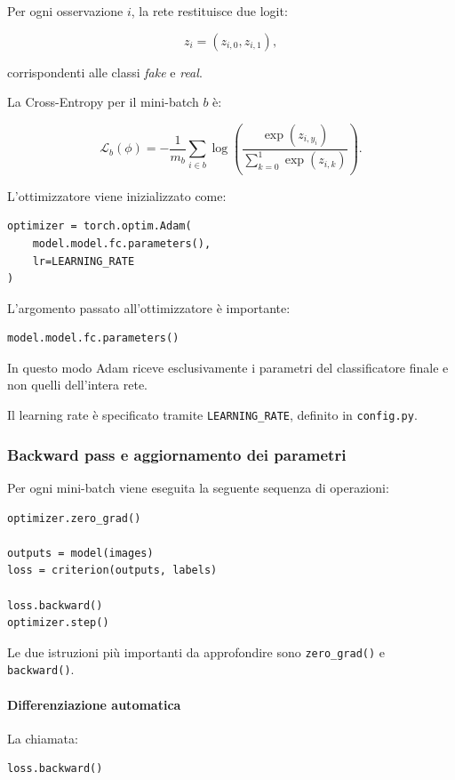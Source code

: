 \documentclass[10pt,a4paper,oneside]{book}
\begin{document}
Per ogni osservazione $i$, la rete restituisce
due logit:

\[
z_i=(z_{i,0},z_{i,1}),
\]

corrispondenti alle classi \textit{fake} e \textit{real}.

La Cross-Entropy per il mini-batch $b$ è:

\[
\mathcal{L}_b(\phi)
=
-\frac{1}{m_b}
\sum_{i\in b}
\log
\left(
\frac{\exp(z_{i,y_i})}
{\sum_{k=0}^{1}\exp(z_{i,k})}
\right).
\]

L'ottimizzatore viene inizializzato come:

\begin{verbatim}
optimizer = torch.optim.Adam(
    model.model.fc.parameters(),
    lr=LEARNING_RATE
)
\end{verbatim}

L'argomento passato all'ottimizzatore è importante:

\begin{verbatim}
model.model.fc.parameters()
\end{verbatim}

In questo modo Adam riceve esclusivamente
i parametri del classificatore finale e non
quelli dell'intera rete.

Il learning rate è specificato tramite
\texttt{LEARNING\_RATE}, definito in
\texttt{config.py}.

\subsubsection{Backward pass e aggiornamento dei parametri}

Per ogni mini-batch viene eseguita la seguente
sequenza di operazioni:

\begin{verbatim}
optimizer.zero_grad()

outputs = model(images)
loss = criterion(outputs, labels)

loss.backward()
optimizer.step()
\end{verbatim}

Le due istruzioni più importanti da approfondire
sono \texttt{zero\_grad()} e \texttt{backward()}.

\paragraph{Differenziazione automatica}

La chiamata:

\begin{verbatim}
loss.backward()
\end{verbatim}
\end{document}
